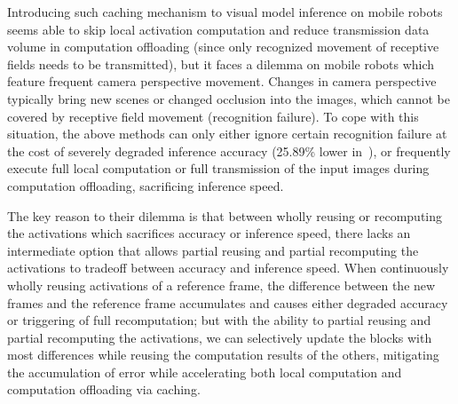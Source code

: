 Introducing such caching mechanism to visual model inference on mobile robots seems able to skip local activation computation and reduce transmission data volume in computation offloading (since only recognized movement of receptive fields needs to be transmitted), but it faces a dilemma on mobile robots which feature frequent camera perspective movement.
Changes in camera perspective typically bring new scenes or changed occlusion into the images, which cannot be covered by receptive field movement (recognition failure).
To cope with this situation, the above methods can only either ignore certain recognition failure at the cost of severely degraded inference accuracy (25.89\% lower in~\cite{}), or frequently execute full local computation or full transmission of the input images during computation offloading, sacrificing inference speed.

The key reason to their dilemma is that between wholly reusing or recomputing the activations which sacrifices accuracy or inference speed, there lacks an intermediate option that allows partial reusing and partial recomputing the activations to tradeoff between accuracy and inference speed.
When continuously wholly reusing activations of a reference frame, the difference between the new frames and the reference frame accumulates and causes either degraded accuracy or triggering of full recomputation; but with the ability to partial reusing and partial recomputing the activations, we can selectively update the blocks with most differences while reusing the computation results of the others, mitigating the accumulation of error while accelerating both local computation and computation offloading via caching. 




